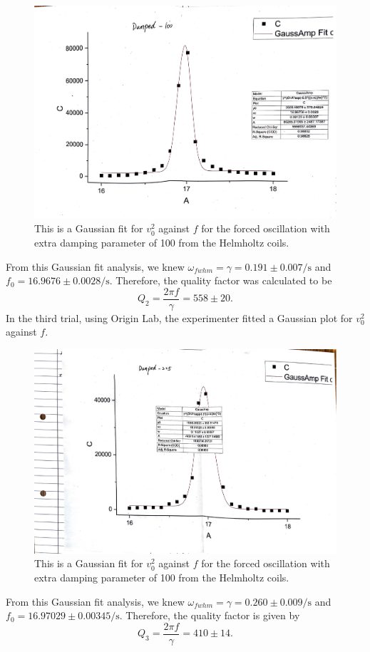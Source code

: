 \documentclass[a4paper,12pt]{article}
\begin{document}
\begin{figure}[h]
	\centering
	\includegraphics[scale=0.4]{images/damped100.pdf}
	\caption{This is a Gaussian fit for \(v_0^2 \) against \( f \) for the forced oscillation with extra damping parameter of 100 from the Helmholtz coils.}
\end{figure}
From this Gaussian fit analysis, we knew \(\omega_{fwhm} = \gamma = 0.191 \pm 0.007 \unit{\per \second} \) and \( f_0 = 16.9676 \pm 0.0028 \unit{\per\second} \). Therefore, the quality factor was calculated to be
\begin{equation}
	Q_2 = \frac{2\pi f}{\gamma} = 558 \pm 20.
\end{equation}
In the third trial, using Origin Lab, the experimenter fitted a Gaussian plot for \( v_0^2 \) against \( f \). 
\begin{figure}[h]
	\centering
	\includegraphics[scale=0.4]{images/damped225.pdf}
	\caption{This is a Gaussian fit for \(v_0^2 \) against \( f \)   for the forced oscillation with extra damping parameter of 100 from the Helmholtz coils.}
\end{figure}
From this Gaussian fit analysis, we knew \(\omega_{fwhm} = \gamma = 0.260 \pm 0.009 \unit{\per \second} \) and \( f_0 = 16.97029 \pm 0.00345 \unit{\per\second}\). Therefore, the quality factor is given by
\begin{equation}
	Q_3 = \frac{2\pi f}{\gamma} = 410 \pm 14.
\end{equation}
\clearpage
\end{document}
